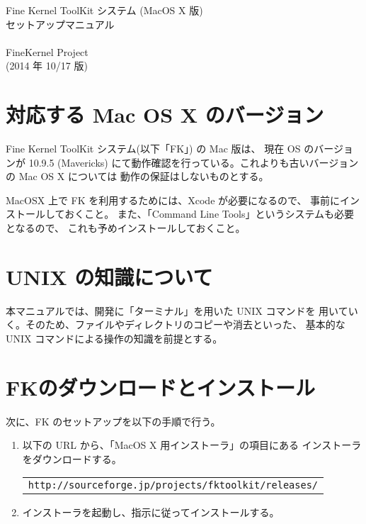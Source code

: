 \documentclass[a4paper]{jsarticle}
\begin{document}
\begin{center}
{\LARGE Fine Kernel ToolKit システム (MacOS X 版) \\
	セットアップマニュアル} \\ ~ \\
{\Large FineKernel Project} \\
(2014 年 10/17 版)
\end{center}

\section{対応する Mac OS X のバージョン}
Fine Kernel ToolKit システム(以下「FK」) の Mac 版は、
現在 OS のバージョンが 10.9.5 (Mavericks)
にて動作確認を行っている。これよりも古いバージョンの Mac OS X については
動作の保証はしないものとする。

MacOSX 上で FK を利用するためには、Xcode が必要になるので、
事前にインストールしておくこと。
また、「Command Line Tools」というシステムも必要となるので、
これも予めインストールしておくこと。

\section{UNIX の知識について}
本マニュアルでは、開発に「ターミナル」を用いた UNIX コマンドを
用いていく。そのため、ファイルやディレクトリのコピーや消去といった、
基本的な UNIX コマンドによる操作の知識を前提とする。

\section{FKのダウンロードとインストール}
次に、FK のセットアップを以下の手順で行う。
\begin{enumerate}
\item 以下の URL から、「MacOS X 用インストーラ」の項目にある
	インストーラをダウンロードする。
	\begin{center}
	\begin{tabular}{c}
	\verb+http://sourceforge.jp/projects/fktoolkit/releases/+
	\end{tabular}
	\end{center}

\item インストーラを起動し、指示に従ってインストールする。
\end{enumerate}
\end{document}
